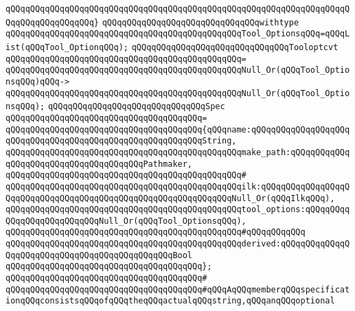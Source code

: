 \verb|qQQqqQQqqQQqqQQqqQQqqQQqqQQqqQQqqQQqqQQqqQQqqQQqqQQqqQQqqQQqqQQqqQQqqQQqqQQqqQQqqQQqqQQq}|\newline
\verb|qQQqqQQqqQQqqQQqqQQqqQQqqQQqqQQqwithtype|\newline
\verb|qQQqqQQqqQQqqQQqqQQqqQQqqQQqqQQqqQQqqQQqqQQqqQQqTool_OptionsqQQq=qQQqList(qQQqTool_OptionqQQq);|\newline
\newline
\verb|qQQqqQQqqQQqqQQqqQQqqQQqqQQqqQQqTooloptcvt|\newline
\verb|qQQqqQQqqQQqqQQqqQQqqQQqqQQqqQQqqQQqqQQqqQQqqQQq=|\newline
\verb|qQQqqQQqqQQqqQQqqQQqqQQqqQQqqQQqqQQqqQQqqQQqqQQqNull_Or(qQQqTool_OptionsqQQq)qQQq->|\newline
\verb|qQQqqQQqqQQqqQQqqQQqqQQqqQQqqQQqqQQqqQQqqQQqqQQqNull_Or(qQQqTool_OptionsqQQq);|\newline
\newline
\verb|qQQqqQQqqQQqqQQqqQQqqQQqqQQqqQQqSpec|\newline
\verb|qQQqqQQqqQQqqQQqqQQqqQQqqQQqqQQqqQQqqQQq=|\newline
\verb|qQQqqQQqqQQqqQQqqQQqqQQqqQQqqQQqqQQqqQQq{qQQqname:qQQqqQQqqQQqqQQqqQQqqQQqqQQqqQQqqQQqqQQqqQQqqQQqqQQqqQQqqQQqString,|\newline
\verb|qQQqqQQqqQQqqQQqqQQqqQQqqQQqqQQqqQQqqQQqqQQqqQQqmake_path:qQQqqQQqqQQqqQQqqQQqqQQqqQQqqQQqqQQqqQQqPathmaker,|\newline
\verb|qQQqqQQqqQQqqQQqqQQqqQQqqQQqqQQqqQQqqQQqqQQqqQQq#|\newline
\verb|qQQqqQQqqQQqqQQqqQQqqQQqqQQqqQQqqQQqqQQqqQQqqQQqilk:qQQqqQQqqQQqqQQqqQQqqQQqqQQqqQQqqQQqqQQqqQQqqQQqqQQqqQQqqQQqqQQqNull_Or(qQQqIlkqQQq),|\newline
\verb|qQQqqQQqqQQqqQQqqQQqqQQqqQQqqQQqqQQqqQQqqQQqqQQqtool_options:qQQqqQQqqQQqqQQqqQQqqQQqqQQqNull_Or(qQQqTool_OptionsqQQq),|\newline
\verb|qQQqqQQqqQQqqQQqqQQqqQQqqQQqqQQqqQQqqQQqqQQqqQQq#qQQqqQQqqQQq|\newline
\verb|qQQqqQQqqQQqqQQqqQQqqQQqqQQqqQQqqQQqqQQqqQQqqQQqderived:qQQqqQQqqQQqqQQqqQQqqQQqqQQqqQQqqQQqqQQqqQQqqQQqBool|\newline
\verb|qQQqqQQqqQQqqQQqqQQqqQQqqQQqqQQqqQQqqQQq};|\newline
\verb|qQQqqQQqqQQqqQQqqQQqqQQqqQQqqQQqqQQqqQQq#|\newline
\verb|qQQqqQQqqQQqqQQqqQQqqQQqqQQqqQQqqQQqqQQq#qQQqAqQQqmemberqQQqspecificationqQQqconsistsqQQqofqQQqtheqQQqactualqQQqstring,qQQqanqQQqoptional|\newline
